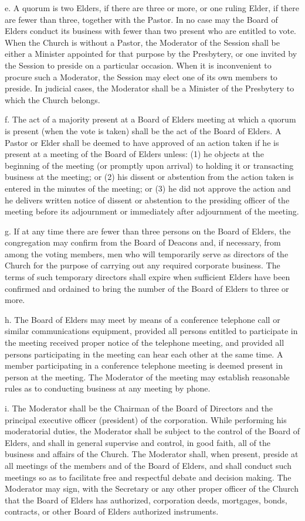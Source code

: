 \documentclass[
]{book}
\begin{document}
e. A quorum is two Elders, if there are three or more, or one ruling Elder, if there are fewer than three, together with the Pastor. In no case may the Board of Elders conduct its business with fewer than two present who are entitled to vote. When the Church is without a Pastor, the Moderator of the Session shall be either a Minister appointed for that purpose by the Presbytery, or one invited by the Session to preside on a particular occasion. When it is inconvenient to procure such a Moderator, the Session may elect one of its own members to preside. In judicial cases, the Moderator shall be a Minister of the Presbytery to which the Church belongs.

f. The act of a majority present at a Board of Elders meeting at which a quorum is present (when the vote is taken) shall be the act of the Board of Elders. A Pastor or Elder shall be deemed to have approved of an action taken if he is present at a meeting of the Board of Elders unless: (1) he objects at the beginning of the meeting (or promptly upon arrival) to holding it or transacting business at the meeting; or (2) his dis­sent or abstention from the action taken is entered in the minutes of the meeting; or (3) he did not approve the action and he delivers written notice of dissent or abstention to the presiding officer of the meeting before its adjournment or immediately after adjournment of the meeting.

g. If at any time there are fewer than three persons on the Board of Elders, the congregation may confirm from the Board of Deacons and, if necessary, from among the voting members, men who will temporarily serve as directors of the Church for the purpose of carrying out any required corporate business. The terms of such temporary directors shall expire when sufficient Elders have been confirmed and ordained to bring the number of the Board of Elders to three or more.

h. The Board of Elders may meet by means of a conference telephone call or similar communications equipment, provided all persons entitled to participate in the meeting received proper notice of the telephone meeting, and provided all persons participating in the meeting can hear each other at the same time. A member participating in a conference telephone meeting is deemed present in person at the meeting. The Moderator of the meeting may establish reasonable rules as to conducting business at any meeting by phone.

i. The Moderator shall be the Chairman of the Board of Directors and the principal executive officer (president) of the corporation. While performing his moderatorial duties, the Moderator shall be subject to the control of the Board of Elders, and shall in general supervise and control, in good faith, all of the business and affairs of the Church. The Moderator shall, when present, preside at all meetings of the members and of the Board of Elders, and shall conduct such meetings so as to facilitate free and respectful debate and decision making. The Moderator may sign, with the Secretary or any other proper officer of the Church that the Board of Elders has authorized, corporation deeds, mortgages, bonds, contracts, or other Board of Elders authorized instruments.
\end{document}
